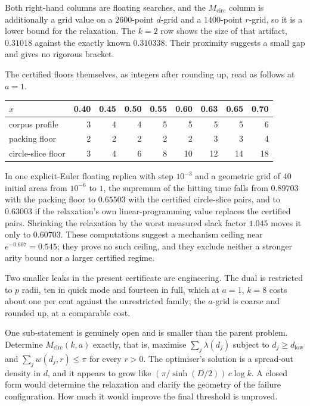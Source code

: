 Both right-hand columns are floating searches, and the $M_{\mathrm{circ}}$
column is additionally a grid value on a $2600$-point $d$-grid and a
$1400$-point $r$-grid, so it is a lower bound for the relaxation.  The $k=2$
row shows the size of that artifact, $0.31018$ against the exactly known
$0.310338$.  Their proximity suggests a small gap and gives no rigorous
bracket.

The certified floors themselves, as integers after rounding up, read as
follows at $a=1$.

\begin{center}
\begin{tabular}{@{}lrrrrrrrr@{}}
\toprule
$x$ & 0.40 & 0.45 & 0.50 & 0.55 & 0.60 & 0.63 & 0.65 & 0.70 \\
\midrule
corpus profile & 3 & 4 & 4 & 5 & 5 & 5 & 5 & 6 \\
packing floor & 2 & 2 & 2 & 2 & 2 & 3 & 3 & 4 \\
circle-slice floor & 3 & 4 & 6 & 8 & 10 & 12 & 14 & 18 \\
\bottomrule
\end{tabular}
\end{center}

In one explicit-Euler floating replica with step $10^{-3}$ and a geometric grid
of $40$ initial areas from $10^{-6}$ to $1$, the supremum of the hitting time
falls from $0.89703$ with the packing floor to $0.65503$ with the certified
circle-slice pairs, and to $0.63003$ if the relaxation's own linear-programming
value replaces the certified pairs.  Shrinking the relaxation by the worst
measured slack factor $1.045$ moves it only to $0.60703$.  These computations
suggest a mechanism ceiling near $e^{-0.607}=0.545$; they prove no such
ceiling, and they exclude neither a stronger arity bound nor a larger certified
regime.

Two smaller leaks in the present certificate are engineering.  The dual is
restricted to $p$ radii, ten in quick mode and fourteen in full, which at
$a=1$, $k=8$ costs about one per cent against the unrestricted family; the
$a$-grid is coarse and rounded up, at a comparable cost.

One sub-statement is genuinely open and is smaller than the parent problem.
Determine $M_{\mathrm{circ}}(k,a)$ exactly, that is, maximise
$\sum_j\lambda(d_j)$ subject to $d_j\ge d_{\mathrm{low}}$ and
$\sum_jw(d_j,r)\le\pi$ for every $r>0$.  The optimiser's solution is a
spread-out density in $d$, and it appears to grow like
$(\pi/\sinh(D/2))\,c\log k$.  A closed form would determine the relaxation and
clarify the geometry of the failure configuration.  How much it would improve
the final threshold is unproved.

